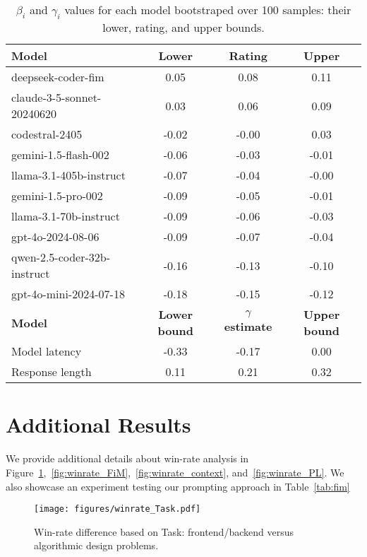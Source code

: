 \begin{table}[h!]
\centering
\caption{$\beta_i$ and $\gamma_i$ values for each model bootstraped over 100 samples: their lower, rating, and upper bounds.}
\begin{tabular}{lccc}
\hline
\textbf{Model} & \textbf{Lower} & \textbf{Rating} & \textbf{Upper} \\ \hline
deepseek-coder-fim         & 0.05  & 0.08  & 0.11  \\
claude-3-5-sonnet-20240620 & 0.03  & 0.06  & 0.09  \\
codestral-2405             & -0.02 & -0.00 & 0.03  \\
gemini-1.5-flash-002       & -0.06 & -0.03 & -0.01 \\
llama-3.1-405b-instruct    & -0.07 & -0.04 & -0.00 \\
gemini-1.5-pro-002         & -0.09 & -0.05 & -0.01 \\
llama-3.1-70b-instruct     & -0.09 & -0.06 & -0.03 \\
gpt-4o-2024-08-06          & -0.09 & -0.07 & -0.04 \\
qwen-2.5-coder-32b-instruct & -0.16 & -0.13 & -0.10 \\
gpt-4o-mini-2024-07-18     & -0.18 & -0.15 & -0.12 \\ \hline
\hline
\textbf{Model} & \textbf{Lower bound} & \textbf{$\gamma$ estimate} & \textbf{Upper bound} \\ \hline
Model latency       & -0.33  & -0.17  & 0.00  \\
Response length & 0.11  &  0.21 &  0.32  \\ \hline
\end{tabular}
\label{tab:style_control}
\end{table}





\section{Additional Results} \label{appendix:add_results}

We provide additional details about win-rate analysis in Figure~\ref{fig:winrate_task},~\ref{fig:winrate_FiM},~\ref{fig:winrate_context}, and~\ref{fig:winrate_PL}. 
We also showcase an experiment testing our prompting approach in Table~\ref{tab:fim}

\begin{figure}[h]
    \centering
    \texttt{[image: figures/winrate\_Task.pdf]}
    \caption{Win-rate difference based on Task: frontend/backend versus algorithmic design problems.}
    \label{fig:winrate_task}
\end{figure}


